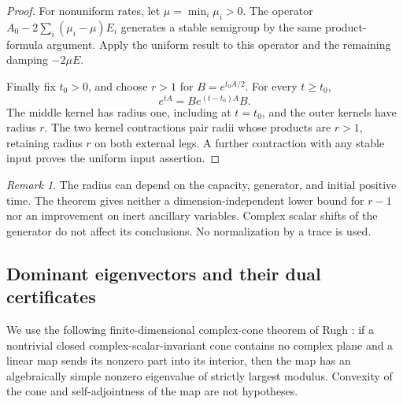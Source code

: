 \documentclass[reqno]{amsart}
\theoremstyle{definition}
\theoremstyle{remark}
\newtheorem{remark}[theorem]{Remark}
\begin{document}
\begin{proof}
For nonuniform rates, let \(\mu=\min_i\mu_i>0\).  The operator
\(A_0-2\sum_i(\mu_i-\mu)E_i\) generates a stable semigroup by the
same product-formula argument.  Apply the uniform result to this
operator and the remaining damping \(-2\mu E\).

Finally fix \(t_0>0\), and choose \(r>1\) for
\(B=e^{t_0A/2}\).  For every \(t\ge t_0\),
\[
 e^{tA}=B e^{(t-t_0)A}B.
\]
The middle kernel has radius one, including at \(t=t_0\), and the
outer kernels have radius \(r\).  The two kernel contractions pair
radii whose products are \(r>1\), retaining radius \(r\) on both
external legs.  A further contraction with any stable input proves the
uniform input assertion.
\end{proof}

\begin{remark}\label{spec:strict-scope}
The radius can depend on the capacity, generator, and initial positive
time.  The theorem gives neither a dimension-independent lower bound for
\(r-1\) nor an improvement on inert ancillary variables.  Complex
scalar shifts of the generator do not affect its conclusions.  No
normalization by a trace is used.
\end{remark}

\subsection{Dominant eigenvectors and their dual certificates}

We use the following finite-dimensional complex-cone theorem of Rugh
\cite[Theorem~8.4]{Rugh10}: if a nontrivial closed complex-scalar-invariant cone
contains no complex plane and a linear map sends its nonzero part into
its interior, then the map has an algebraically simple nonzero
eigenvalue of strictly largest modulus.  Convexity of the cone and
self-adjointness of the map are not hypotheses.
\end{document}
